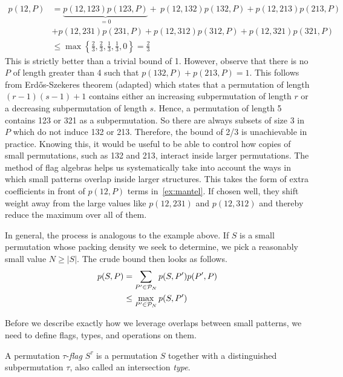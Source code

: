 \documentclass[12pt, a4paper, twoside]{report}
\begin{document}
\begin{equation}
\begin{aligned}
p(12, P) &= \underbrace{p(12, 123)p(123,P)}_{ = 0} +\ p(12, 132)p(132,P) + p(12, 213)p(213,P)\\
  &+ p(12, 231)p(231,P) + p(12, 312)p(312,P) + p(12,321)p(321,P)\\
  &\leq \max \left\{\frac{2}{3}, \frac{2}{3}, \frac{1}{3}, \frac{1}{3}, 0\right\} = \frac{2}{3}
\label{ex:mantel}
\end{aligned}
\end{equation}
This is strictly better than a trivial bound of 1. However, observe that there is no $P$ of length greater than 4 such that $p(132,P) + p(213,P) = 1$. This follows from Erd\H{o}s-Szekeres theorem (adapted) which states that a permutation of length $(r-1)(s-1)+1$ contains either an increasing subpermutation of length $r$ or a decreasing subpermutation of length $s$. Hence, a permutation of length 5 contains 123 or 321 as a subpermutation. So there are always subsets of size 3 in $P$ which do not induce 132 or 213. Therefore, the bound of 2/3 is unachievable in practice. Knowing this, it would be useful to be able to control how copies of small permutations, such as 132 and 213, interact inside larger permutations. The method of flag algebras helps us systematically take into account the ways in which small patterns overlap inside larger structures. This takes the form of extra coefficients in front of $p(12,P)$ terms in~\eqref{ex:mantel}. If chosen well, they shift weight away from the large values like $p(12,231)$ and $p(12,312)$ and thereby reduce the maximum over all of them.

In general, the process is analogous to the example above. If $S$ is a small permutation whose packing density we seek to determine, we pick a reasonably small value $N \geq |S|$. The crude bound then looks as follows.
\begin{align}
  p(S,P) &= \sum_{P' \in \P_N}p(S,P')p(P',P)\notag\\
  &\leq \max_{P' \in \P_N} p(S,P') \label{eq:crudebd}
\end{align}

Before we describe exactly how we leverage overlaps between small patterns, we need to define flags, types, and operations on them.

\begin{definition}[Flag]
\label{def:permflag}
A permutation $\tau$-\emph{flag} $S^{\tau}$ is a permutation $S$ together with a distinguished subpermutation $\tau$, also called an intersection \emph{type}.
\end{definition}
\end{document}
